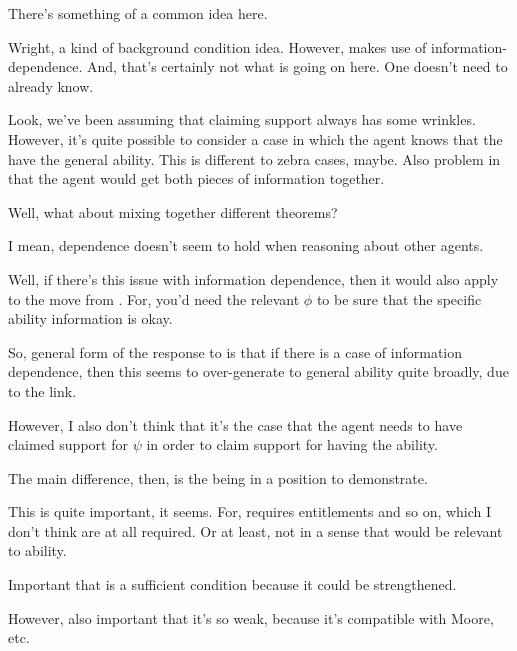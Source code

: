 \begin{note}[Differences]
  There's something of a common idea here.

  Wright, a kind of background condition idea.
  However, \citeauthor{Wright:2011wn} makes use of information-dependence.
  And, that's certainly not what is going on here.
  One doesn't need to already know.

  Look, we've been assuming that claiming support always has some wrinkles.
  However, it's quite possible to consider a case in which the agent knows that the have the general ability.
  This is different to zebra cases, maybe.
  Also problem in that the agent would get both pieces of information together.

  Well, what about mixing together different theorems?

  I mean, dependence doesn't seem to hold when reasoning about other agents.

  Well, if there's this issue with information dependence, then it would also apply to the move from \gsi{-}.
  For, you'd need the relevant \(\phi\) to be sure that the specific ability information is okay.

  So, general form of the response to \citeauthor{Wright:2011wn} is that if there is a case of information dependence, then this seems to over-generate to general ability quite broadly, due to the \gsi{} link.

  However, I also don't think that it's the case that the agent needs to have claimed support for \(\psi\) in order to claim support for having the ability.

  The main difference, then, is the being in a position to demonstrate.
\end{note}

\begin{note}
  This is quite important, it seems.
  For, \citeauthor{Wright:2011wn} requires entitlements and so on, which I don't think are at all required.
  Or at least, not in a sense that would be relevant to ability.
\end{note}

\begin{note}
  Important that \nI{} is a sufficient condition because it could be strengthened.

  However, also important that it's so weak, because it's compatible with Moore, etc.\
\end{note}


